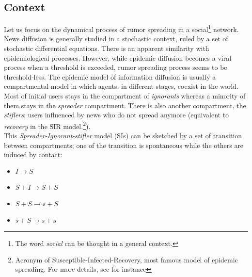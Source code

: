 \subsection{Context}
Let us focus on the dynamical process of rumor spreading in a social\footnote{The word \textit{social} can be thought in a general context.} network.
\\ News diffusion is generally studied in a stochastic context, ruled by a set of stochastic differential equations.
 There is an apparent similarity with epidemiological processes. 
However, while epidemic diffusion becomes a viral process when a threshold is exceeded, rumor spreading process seems to be threshold-less.
 The epidemic model of information diffusion is usually a compartmental model in which agents, in different stages, coexist in the world.
 Most of initial users stays in the compartment of \textit{ignorants} whereas a minority of them stays in the \textit{spreader} compartment.
 There is also another compartment, the \textit{stiflers}: users influenced by news who do not spread anymore (equivalent to \textit{recovery} in the SIR model.\footnote{Acronym of Susceptible-Infected-Recovery, most famous model of epidemic spreading. For more details, see for instance }).
\\ This \textit{Spreader-Ignorant-stifler} model (SIs) can be sketched by a set of transition between compartments; one of the transition is spontaneous while the others are induced by contact:
\begin{itemize}
\item$ I \longrightarrow S$
\item $S+I \longrightarrow S + S$

\item $S + S \longrightarrow s + S$

\item $s + S \longrightarrow  s + s$
\end{itemize}

